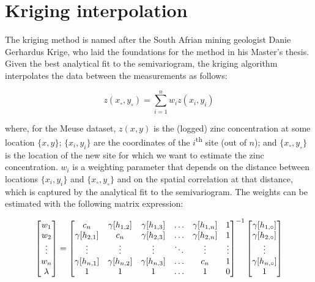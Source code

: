 \section{Kriging interpolation}
\label{sec:kriging}

The kriging method is named after the South Afrian mining geologist
Danie Gerhardus Krige, who laid the foundations for the method in his
Master's thesis.  Given the best analytical fit to the semivariogram,
the kriging algorithm interpolates the data between the measurements
as follows:

\begin{equation}
z(x_\circ,y_\circ) = \sum\limits_{i=1}^n w_i z(x_i,y_i)
\label{eq:kriging}
\end{equation}

\noindent where, for the Meuse dataset, $z(x,y)$ is the (logged) zinc
concentration at some location $\{x,y\}$; $\{x_i,y_i\}$ are the
coordinates of the $i$\textsuperscript{th} site (out of $n$); and
$\{x_\circ,y_\circ\}$ is the location of the new site for which we
want to estimate the zinc concentration. $w_i$ is a weighting
parameter that depends on the distance between locations $\{x_i,y_i\}$
and $\{x_\circ,y_\circ\}$ and on the spatial correlation at that
distance, which is captured by the analytical fit to the
semivariogram. The weights can be estimated with the following matrix
expression:

\begin{equation}
  \left[
    \begin{array}{@{}c@{}}
      w_1 \\
      w_2 \\
      \vdots \\
      w_n \\
      \lambda
    \end{array}
    \right]
  =
  \left[
    \begin{array}{@{}cccccc@{}}
      c_n & \gamma[h_{1,2}] & \gamma[h_{1,3}] & \ldots & \gamma[h_{1,n}] & 1 \\
      \gamma[h_{2,1}] & c_n & \gamma[h_{2,3}] & \ldots & \gamma[h_{2,n}] & 1 \\
      \vdots & \vdots & \vdots & \ddots & \vdots & \vdots \\
      \gamma[h_{n,1}] & \gamma[h_{n,2}] & \gamma[h_{n,3}] & \ldots & c_n & 1 \\
      1 & 1 & 1 & \ldots & 1 & 0 \\
    \end{array}
    \right]^{-1}
  \left[
    \begin{array}{@{}c@{}}
      \gamma[h_{1,\circ}] \\
      \gamma[h_{2,\circ}] \\
      \vdots \\
      \gamma[h_{n,\circ}]\\
      1
    \end{array}
    \right]
\label{eq:krigingweights}
\end{equation}

